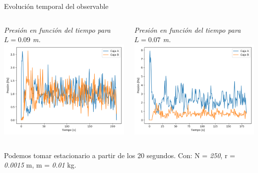 \documentclass{beamer}
\begin{document}
\begin{frame}{Evolución temporal del observable}
  \begin{columns}
    \begin{column}{0.5\textwidth}
      \tiny \textit{Presión en función del tiempo para $L = 0.09$ m.}
      \includegraphics[width=\linewidth]{photoMaterial/pvt_09.png}
    \end{column}
    \begin{column}{0.5\textwidth}
      \tiny \textit{Presión en función del tiempo para $L = 0.07$ m.}
      \includegraphics[width=\linewidth]{photoMaterial/pvt_07.png}
    \end{column}
    \end{columns}
    \tiny Podemos tomar estacionario a partir de los 20 segundos.
    \tiny Con: N = \textit{250}, r = \textit{0.0015} m, m = \textit{0.01} kg.
\end{frame}
\end{document}
